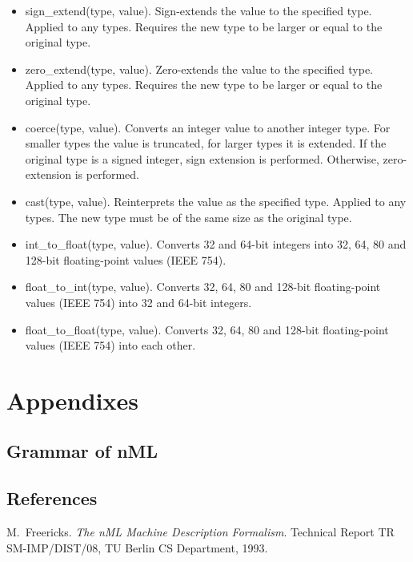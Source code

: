 \documentclass[oneside,final,14pt]{extreport}
\begin{document}
\begin{itemize}
\item sign{\_}extend(type, value).
Sign-extends the value to the specified type. Applied to any types. Requires
the new type to be larger or equal to the original type.

\item zero{\_}extend(type, value).
Zero-extends the value to the specified type. Applied to any types. Requires the new type to be larger or equal to the original type.

\item coerce(type, value).
Converts an integer value to another integer type. For smaller types the value is truncated, for larger types it is extended. If the original type is a signed integer, sign extension is performed. Otherwise, zero-extension is performed.

\item cast(type, value).
Reinterprets the value as the specified type. Applied to any types. The new type must be of the same size as the original type.

\item int{\_}to{\_}float(type, value).
Converts 32 and 64-bit integers into 32, 64, 80 and 128-bit floating-point values (IEEE 754).

\item float{\_}to{\_}int(type, value).
Converts 32, 64, 80 and 128-bit floating-point values (IEEE 754) into 32 and 64-bit integers.

\item float{\_}to{\_}float(type, value).
Converts 32, 64, 80 and 128-bit floating-point values (IEEE 754) into each other.

\end{itemize}






\chapter{Appendixes}

\section{Grammar of nML}

\section{References}



\begin{thebibliography}{1}

M.~Freericks.
\emph{The nML Machine Description Formalism}.
Technical Report TR SM-IMP/DIST/08, TU Berlin CS Department, 1993.

\end{thebibliography}
\end{document}
